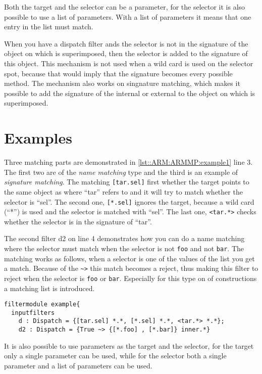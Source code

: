 Both the target and the selector can be a parameter, for the selector it is also possible to use a list of parameters.
With a list of parameters it means that one entry in the list must match.

When you have a dispatch filter ands the selector is not in the signature of the object on which is superimposed, then the selector is added to the
signature of this object. This mechanism is not used when a wild card is used on the selector spot,
because that would imply that the signature becomes every possible method. The mechanism also works on singnature matching, which makes it possible to add the signature of the internal or external to the object on which is superimposed.

\section*{Examples}
Three matching parts are demonstrated in \autoref{lst::ARM:ARMMP:example1} line 3. The first two
are of the \emph{name matching} type and the third is an example of \emph{signature matching}.
The matching \lstinline|[tar.sel]| first whether the target points to the same object as where ``tar'' refers to and
it will try to match whether the selector is ``sel''. The second one,
\lstinline|[*.sel]| ignores the target, because a wild card (``*'') is used and the selector is matched
with ``sel''. The last one, \lstinline|<tar.*>| checks whether the selector is in the signature of ``tar''.

The second filter d2 on line 4 demonstrates how you can do a name matching where the selector must match when the selector is not \lstinline!foo! and not \lstinline!bar!.
The matching works as follows, when a selector is one of the values of the list you get a match. Because of the \lstinline[language=Composestar]|~>| this match becomes a reject, thus making this
filter to reject when the selector is \lstinline!foo! or \lstinline!bar!.
Especially for this type on of constructions a matching list is introduced.

\begin{lstlisting}[caption={Some possible matching parts},label=lst::ARM:ARMMP:example1,
style=listing,language =ComposeStar,float=tpb]
filtermodule example{
  inputfilters
    d : Dispatch = {[tar.sel] *.*, [*.sel] *.*, <tar.*> *.*};
    d2 : Dispatch = {True ~> {[*.foo] , [*.bar]} inner.*}
\end{lstlisting}

It is also possible to use parameters as the target and the selector, for the target
only a single parameter can be used, while for the selector both a single parameter and a list of parameters can be used.

